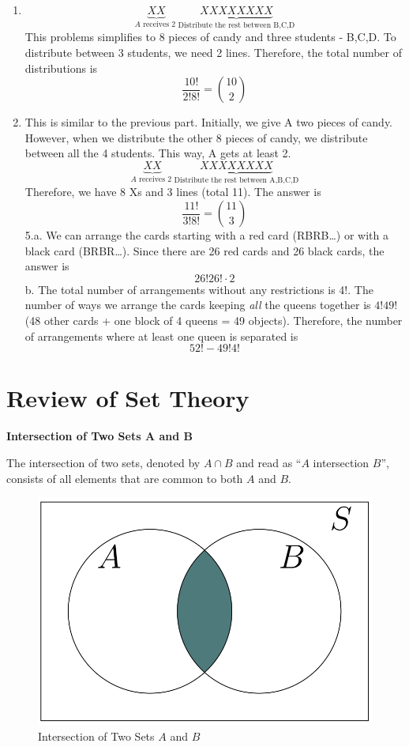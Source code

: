 \documentclass[
  12pt,
]{krantzNoCorner}
\begin{document}
\begin{enumerate}
\def\labelenumi{\alph{enumi}.}
\setcounter{enumi}{1}
\item
  \[\underbrace{XX}_{A\text{ receives 2 
   }}\underbrace{XXXXXXXX}_{\text{Distribute the rest between B,C,D}}\]
  This problems simplifies to 8 pieces of candy and three students -
  B,C,D. To distribute between 3 students, we need 2 lines. Therefore,
  the total number of distributions is
  \[\frac{10!}{2!8!}=\binom{10}{2}\]
\item
  This is similar to the previous part. Initially, we give A two
  pieces of candy. However, when we distribute the other 8 pieces of
  candy, we distribute between all the 4 students. This way, A gets at
  least 2. \[\underbrace{XX}_{A\text{ receives 2 
   }}\underbrace{XXXXXXXX}_{\text{Distribute the rest between A,B,C,D}}\]
  Therefore, we have 8 Xs and 3 lines (total 11). The answer is
  \[\frac{11!}{3!8!}=\binom{11}{3}\] 5.a. We can arrange the cards
  starting with a red card (RBRB\ldots) or with a black card (BRBR\ldots).
  Since there are 26 red cards and 26 black cards, the answer is
  \[ 26!26!\cdot2\] b. The total number of arrangements without any
  restrictions is 4!. The number of ways we arrange the cards keeping
  \textit{all} the queens together is \(4!49!\) (48 other cards + one
  block of 4 queens = 49 objects). Therefore, the number of
  arrangements where at least one queen is separated is \[52!-49!4!\]
\end{enumerate}

\hypertarget{review-of-set-theory}{%
\section{Review of Set Theory}\label{review-of-set-theory}}

\textbf{Intersection of Two Sets A and B}

The intersection of two sets, denoted by \(A \cap B\) and read as ``\(A\)
intersection \(B\)'', consists of all elements that are common to both \(A\)
and \(B\).

\begin{figure}
\includegraphics[width=0.5\linewidth,height=0.4\textheight]{Ven1} \caption{Intersection of Two Sets $A$ and $B$}\label{fig:intersec}
\end{figure}
\end{document}
